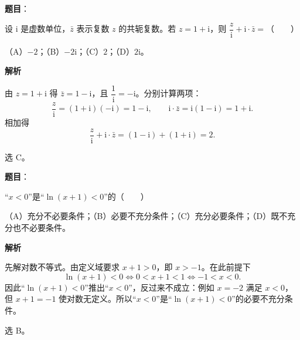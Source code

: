 

\begin{answer}

\textbf{题目}：

设 $\mathrm i$ 是虚数单位，$\bar z$ 表示复数 $z$ 的共轭复数。若 $z=1+\mathrm i$，则 $\dfrac{z}{\mathrm i}+\mathrm i\cdot\bar z=$\mbox{（　　）}

（A）$-2$；（B）$-2\mathrm i$；（C）$2$；（D）$2\mathrm i$。

\textbf{解析}

由 $z=1+\mathrm i$ 得 $\bar z=1-\mathrm i$，且 $\dfrac1{\mathrm i}=-\mathrm i$。分别计算两项：
\nopagebreak[4]
\[\frac{z}{\mathrm i}=(1+\mathrm i)(-\mathrm i)=1-\mathrm i,\qquad
\mathrm i\cdot\bar z=\mathrm i(1-\mathrm i)=1+\mathrm i .\]
相加得
\nopagebreak[4]
\[\frac{z}{\mathrm i}+\mathrm i\cdot\bar z=(1-\mathrm i)+(1+\mathrm i)=2 .\]

选 C。


\end{answer}
\begin{answer}

\textbf{题目}：

“$x<0$”是“$\ln(x+1)<0$”的\mbox{（　　）}

（A）充分不必要条件；（B）必要不充分条件；（C）充分必要条件；（D）既不充分也不必要条件。

\textbf{解析}

先解对数不等式。由定义域要求 $x+1>0$，即 $x>-1$。在此前提下
\nopagebreak[4]
\[\ln(x+1)<0\iff 0<x+1<1\iff -1<x<0 .\]
因此“$\ln(x+1)<0$”推出“$x<0$”，反过来不成立：例如 $x=-2$ 满足 $x<0$，但 $x+1=-1$ 使对数无定义。所以“$x<0$”是“$\ln(x+1)<0$”的必要不充分条件。

选 B。


\end{answer}
